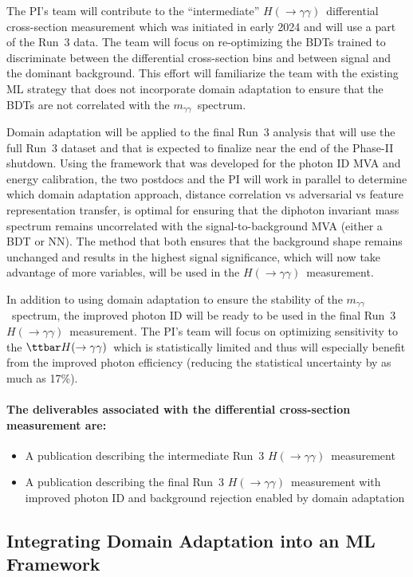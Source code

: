 \documentclass[letter, USenglish, 11pt, subfigure]{article}
\newcommand{\tthyy}{\ensuremath{\ttbar H(\to\gamma\gamma)}}
\newcommand{\myy}{\ensuremath{m_{\gamma\gamma}}}
\newcommand{\hyy}{\ensuremath{H(\to\gamma\gamma)}}
\begin{document}
The PI's team will contribute to the ``intermediate'' \hyy\ differential cross-section measurement which was initiated in early 2024 and will use a part of the Run~3 data. The team will focus on re-optimizing the BDTs trained to discriminate between the differential cross-section bins and between signal and the dominant background. This effort will familiarize the team with the existing ML strategy that does not incorporate domain adaptation to ensure that the BDTs are not correlated with the \myy\ spectrum.

Domain adaptation will be applied to the final Run~3 analysis that will use the full Run~3 dataset and that is expected to finalize near the end of the Phase-II shutdown. Using the framework that was developed for the photon ID MVA and energy calibration, the two postdocs and the PI will work in parallel to determine which domain adaptation approach, distance correlation vs adversarial vs feature representation transfer, is optimal for ensuring that the diphoton invariant mass spectrum remains uncorrelated with the signal-to-background MVA (either a BDT or NN). The method that both ensures that the background shape remains unchanged and results in the highest signal significance, which will now take advantage of more variables, will be used in the \hyy\ measurement.

In addition to using domain adaptation to ensure the stability of the \myy\ spectrum, the improved photon ID will be ready to be used in the final Run~3 \hyy\ measurement. The PI's team will focus on optimizing sensitivity to the \tthyy\ which is statistically limited and thus will especially benefit from the improved photon efficiency (reducing the statistical uncertainty by as much as 17\%).

\paragraph{The deliverables associated with the differential cross-section measurement are:}
\begin{itemize}
\item A publication describing the intermediate Run~3 \hyy\ measurement
\item A publication describing the final Run~3 \hyy\ measurement with improved photon ID and background rejection enabled by domain adaptation
\end{itemize}

\subsection{Integrating Domain Adaptation into an ML Framework}
\end{document}
